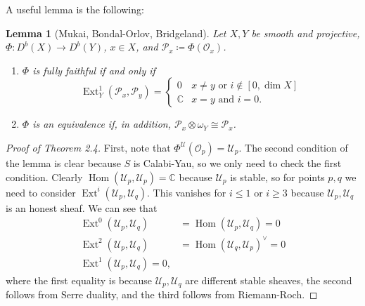 \documentclass{amsart}
\newtheorem{lem}[thm]{Lemma}
\theoremstyle{definition}
\theoremstyle{remark}
\theoremstyle{plain}
\theoremstyle{definition}
\theoremstyle{remark}
\newcommand{\C}{\mathbb{C}}
\newcommand{\mc}[1]{\mathcal{#1}}
\newcommand{\1}{\mathbf{1}}
\newcommand{\2}{\mathbf{2}}
\newcommand{\3}{\mathbf{3}}
\DeclareMathOperator{\Hom}{Hom}
\DeclareMathOperator{\Ext}{Ext}
\begin{document}
A useful lemma is the following:
\begin{lem}[Mukai, Bondal-Orlov, Bridgeland]
    Let $X, Y$ be smooth and projective, $\Phi \colon D^b(X) \to D^b(Y)$, $x \in X$, and $\mc{P}_x \coloneqq \Phi(\mc{O}_x)$.
    \begin{enumerate}
        \item $\Phi$ is fully faithful if and only if
            \[ \Ext^1_Y(\mc{P}_x, \mc{P}_y) = \begin{cases}
                0 & x \neq y \text{ or } i \notin [0, \dim X] \\
                \C & x = y \text{ and } i=0.
            \end{cases}
            \]
        \item $\Phi$ is an equivalence if, in addition, $\mc{P}_x \otimes \omega_Y \cong \mc{P}_x$.
    \end{enumerate}
\end{lem}

\begin{proof}[Proof of Theorem 2.4]
    First, note that $\Phi^{\mc{U}}(\mc{O}_p) = \mc{U}_p$. The second condition of the lemma is clear because $S$ is Calabi-Yau, so we only need to check the first condition. Clearly $\Hom(\mc{U}_p, \mc{U}_p) = \C$ because $\mc{U}_p$ is stable, so for points $p, q$ we need to consider $\Ext^i(\mc{U}_p, \mc{U}_q)$. This vanishes for $i \leq 1$ or $i \geq 3$ because $\mc{U}_p, \mc{U}_q$ is an honest sheaf. We can see that
    \begin{align*}
        \Ext^0(\mc{U}_p, \mc{U}_q) &= \Hom(\mc{U}_p, \mc{U}_q) = 0 \\
        \Ext^2(\mc{U}_p, \mc{U}_q) &= \Hom(\mc{U}_q, \mc{U}_p)^{\vee} = 0 \\
        \Ext^1(\mc{U}_p, \mc{U}_q) = 0,
    \end{align*}
    where the first equality is because $\mc{U}_p, \mc{U}_q$ are different stable sheaves, the second follows from Serre duality, and the third follows from Riemann-Roch.
\end{proof}
\end{document}
